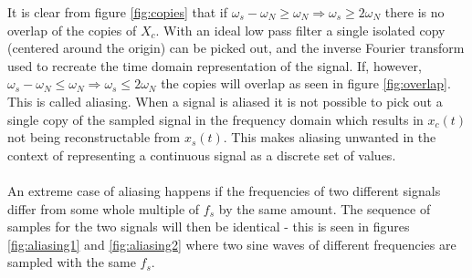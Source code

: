 \noindent It is clear from figure \ref{fig:copies} that if $\omega_s-\omega_N\geq \omega_N\Rightarrow \omega_s\geq 2\omega_N$ there is no overlap of the copies of $X_c$. With an ideal low pass filter  a single isolated copy (centered around the origin) can be picked out, and the inverse Fourier transform used to recreate the time domain representation of the signal. If, however, $\omega_s-\omega_N\leq \omega_N\Rightarrow \omega_s\leq 2\omega_N$ the copies will overlap as seen in figure \ref{fig:overlap}. This is called aliasing. When a signal is aliased it is not possible to pick out a single copy of the sampled signal in the frequency domain which results in $x_c(t)$ not being reconstructable from $x_s(t)$. This makes aliasing unwanted in the context of representing a continuous signal as a discrete set of values.
\\\\
An extreme case of aliasing happens if the frequencies of two different signals differ from some whole multiple of $f_s$ by the same amount. The sequence of samples for the two signals will then be identical - this is seen in figures  \ref{fig:aliasing1} and \ref{fig:aliasing2} where two sine waves of different frequencies are sampled with the same $f_s$.
